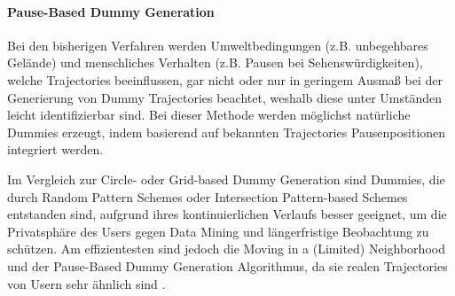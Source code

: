 	\paragraph{Pause-Based Dummy Generation \cite{Kato2012}}
	Bei den bisherigen Verfahren werden Umweltbedingungen (z.B. unbegehbares Gelände) und menschliches Verhalten (z.B. Pausen bei Sehenswürdigkeiten), welche Trajectories beeinflussen, gar nicht oder nur in geringem Ausmaß bei der Generierung von Dummy Trajectories beachtet, weshalb diese unter Umständen leicht identifizierbar sind. Bei dieser Methode werden möglichst natürliche Dummies erzeugt, indem basierend auf bekannten Trajectories Pausenpositionen integriert werden.

Im Vergleich zur Circle- oder Grid-based Dummy Generation sind Dummies, die durch Random Pattern Schemes oder Intersection Pattern-based Schemes entstanden sind, aufgrund ihres kontinuierlichen Verlaufs besser geeignet, um die Privatsphäre des Users gegen Data Mining und längerfristige Beobachtung zu schützen. Am effizientesten sind jedoch die Moving in a (Limited) Neighborhood und der Pause-Based Dummy Generation Algorithmus, da sie realen Trajectories von Usern sehr ähnlich sind \cite{Kukkapalli2012}. 
